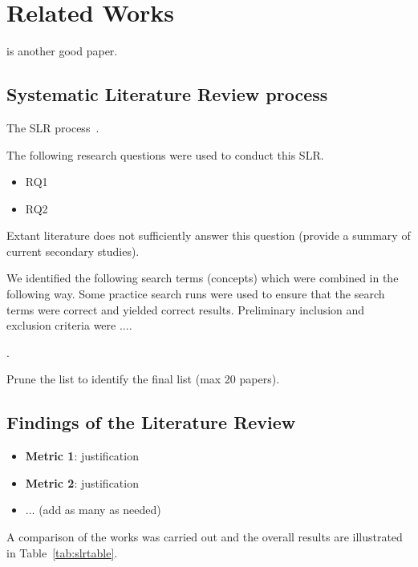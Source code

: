
\section{Related Works}
\label{sec:literature}

\cite{ala} is another good paper.

\subsection{Systematic Literature Review process}

The SLR process~\cite{kitchenham2009systematic}.

The following research questions were used to conduct this SLR. 
\begin{itemize}
    \item RQ1
    \item RQ2
\end{itemize}
Extant literature does not sufficiently answer this question (provide a summary of current secondary studies).

 We identified the following search terms (concepts) which were combined in the following way. Some practice search runs were used to ensure that the search terms were correct and yielded correct results.
Preliminary inclusion and exclusion criteria were ....

.



Prune the list to identify the final list (max 20 papers). 

\subsection{Findings of the Literature Review}

\begin{itemize}
    \item \textbf{Metric 1}: justification
    \item \textbf{Metric 2}: justification
    \item $\ldots$ (add as many as needed)
\end{itemize}

A comparison of the works was carried out and the overall results are illustrated in Table~\ref{tab:slrtable}.






